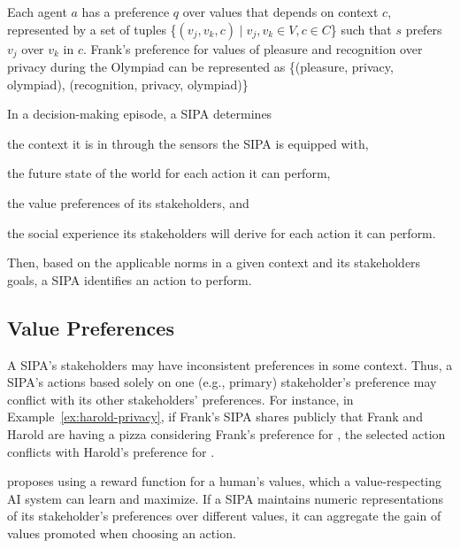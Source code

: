 Each agent $a$ has a preference $q$ over values that depends on context $c$,
represented by a set of tuples \{$(v_j, v_k, c) \mid v_j, v_k \in V, c \in C$\} such that $s$ prefers $v_j$ over $v_k$ in $c$. Frank's preference for values of pleasure and recognition over privacy during the 
Olympiad can be represented as \{(pleasure, privacy, olympiad), (recognition, privacy, olympiad)\}



In a decision-making episode, a SIPA determines
\begin{enumerate*}[label=(\arabic*)]
\item the context it is in through the sensors the SIPA is equipped with,
\item the future state of the world for each action it can perform,
\item the value preferences of its stakeholders, and
\item the social experience its stakeholders will derive for each action it can perform.
\end{enumerate*}
Then, based on the applicable norms in a given context and its
stakeholders goals, a SIPA identifies an action to perform.

\subsection{Value Preferences}

A SIPA's stakeholders may have inconsistent preferences in some context. Thus, a SIPA's actions based solely on one (e.g., primary)
stakeholder's preference may conflict with its other stakeholders'
preferences. For instance, in Example~\ref{ex:harold-privacy}, if
Frank's SIPA shares publicly that Frank and Harold are having a pizza
considering Frank's preference for , the selected action 
conflicts with Harold's preference for .

\citet{Sotala2017HumanValues} proposes using a reward function for a
human's values, which a value-respecting AI system can learn and 
maximize. If a SIPA maintains numeric representations of its
stakeholder's preferences over different values, it can aggregate the gain
of values promoted when choosing an action.

